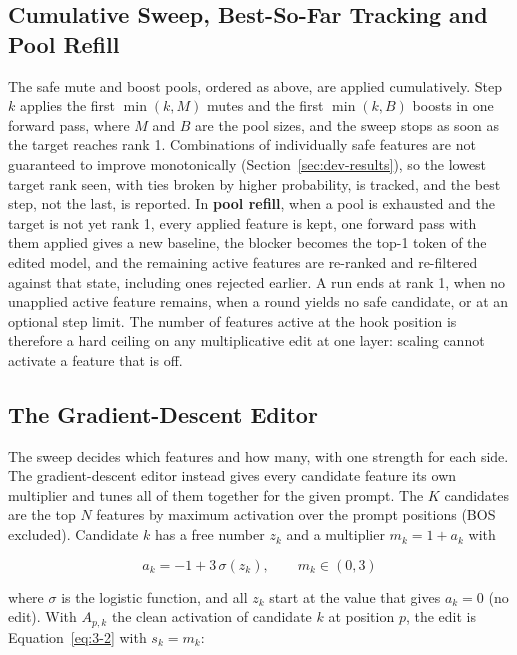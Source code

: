 \documentclass[12pt,a4paper]{report}
\begin{document}
\subsection{Cumulative Sweep, Best-So-Far Tracking and Pool Refill}\label{sec:sweep-def}

The safe mute and boost pools, ordered as above, are applied cumulatively. Step $k$ applies the first $\min(k, M)$ mutes and the first $\min(k, B)$ boosts in one forward pass, where $M$ and $B$ are the pool sizes, and the sweep stops as soon as the target reaches rank 1. Combinations of individually safe features are not guaranteed to improve monotonically (Section~\ref{sec:dev-results}), so the lowest target rank seen, with ties broken by higher probability, is tracked, and the best step, not the last, is reported. In \textbf{pool refill}, when a pool is exhausted and the target is not yet rank 1, every applied feature is kept, one forward pass with them applied gives a new baseline, the blocker becomes the top-1 token of the edited model, and the remaining active features are re-ranked and re-filtered against that state, including ones rejected earlier. A run ends at rank 1, when no unapplied active feature remains, when a round yields no safe candidate, or at an optional step limit. The number of features active at the hook position is therefore a hard ceiling on any multiplicative edit at one layer: scaling cannot activate a feature that is off.

\subsection{The Gradient-Descent Editor}\label{sec:gd-def}

The sweep decides which features and how many, with one strength for each side. The gradient-descent editor instead gives every candidate feature its own multiplier and tunes all of them together for the given prompt. The $K$ candidates are the top $N$ features by maximum activation over the prompt positions (BOS excluded). Candidate $k$ has a free number $z_k$ and a multiplier $m_k = 1 + a_k$ with

\begin{equation}
a_k = -1 + 3\,\sigma(z_k), \qquad m_k \in (0, 3)
\label{eq:3-7}
\end{equation}

where $\sigma$ is the logistic function, and all $z_k$ start at the value that gives $a_k = 0$ (no edit). With $A_{p,k}$ the clean activation of candidate $k$ at position $p$, the edit is Equation~\ref{eq:3-2} with $s_k = m_k$:
\end{document}

